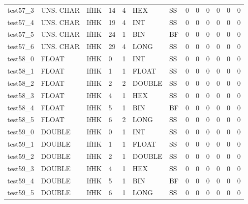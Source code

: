 \begin{longtable}{|l|l|l|p{0.5cm}|p{0.5cm}|l|p{0.5cm}|p{0.5cm}|p{0.5cm}|l|l|p{0.5cm}|l|}
test57\_3 & UNS. CHAR & IfHK & 14 & 4 & HEX & SS & 0 & 0 & 0 & 0 & 0 & 0 \\
test57\_4 & UNS. CHAR & IfHK & 19 & 4 & INT & SS & 0 & 0 & 0 & 0 & 0 & 0 \\
test57\_5 & UNS. CHAR & IfHK & 24 & 1 & BIN & BF & 0 & 0 & 0 & 0 & 0 & 0 \\
test57\_6 & UNS. CHAR & IfHK & 29 & 4 & LONG & SS & 0 & 0 & 0 & 0 & 0 & 0 \\
test58\_0 & FLOAT & IfHK & 0 & 1 & INT & SS & 0 & 0 & 0 & 0 & 0 & 0 \\
test58\_1 & FLOAT & IfHK & 1 & 1 & FLOAT & SS & 0 & 0 & 0 & 0 & 0 & 0 \\
test58\_2 & FLOAT & IfHK & 2 & 2 & DOUBLE & SS & 0 & 0 & 0 & 0 & 0 & 0 \\
test58\_3 & FLOAT & IfHK & 4 & 1 & HEX & SS & 0 & 0 & 0 & 0 & 0 & 0 \\
test58\_4 & FLOAT & IfHK & 5 & 1 & BIN & BF & 0 & 0 & 0 & 0 & 0 & 0 \\
test58\_5 & FLOAT & IfHK & 6 & 2 & LONG & SS & 0 & 0 & 0 & 0 & 0 & 0 \\
test59\_0 & DOUBLE & IfHK & 0 & 1 & INT & SS & 0 & 0 & 0 & 0 & 0 & 0 \\
test59\_1 & DOUBLE & IfHK & 1 & 1 & FLOAT & SS & 0 & 0 & 0 & 0 & 0 & 0 \\
test59\_2 & DOUBLE & IfHK & 2 & 1 & DOUBLE & SS & 0 & 0 & 0 & 0 & 0 & 0 \\
test59\_3 & DOUBLE & IfHK & 4 & 1 & HEX & SS & 0 & 0 & 0 & 0 & 0 & 0 \\
test59\_4 & DOUBLE & IfHK & 5 & 1 & BIN & BF & 0 & 0 & 0 & 0 & 0 & 0 \\
test59\_5 & DOUBLE & IfHK & 6 & 1 & LONG & SS & 0 & 0 & 0 & 0 & 0 & 0 \\
\hline
\end{longtable}
\normalsize
